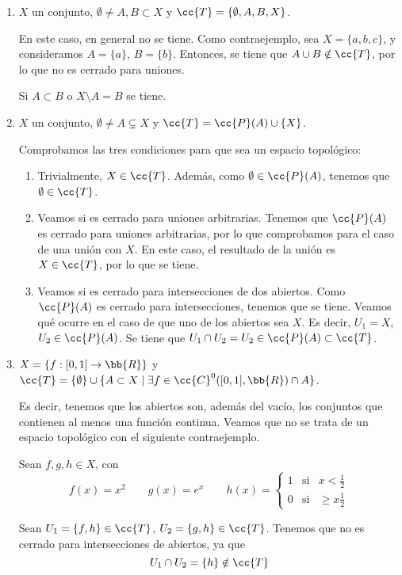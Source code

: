 \begin{ejercicio}
\begin{enumerate}[label=\alph*)]
        \item $X$ un conjunto, $\emptyset\neq A,B\subset X$ y $\cc{T}=\{\emptyset, A, B, X\}$.

        En este caso, en general no se tiene. Como contraejemplo, sea $X=\{a,b,c\}$, y consideramos $A=\{a\}$, $B=\{b\}$. Entonces, se tiene que $A\cup B\notin \cc{T}$, por lo que no es cerrado para uniones.

        Si $A\subset B$ o $X\setminus A=B$ se tiene.

        \item $X$ un conjunto, $\emptyset\neq A \subsetneq X$ y $\cc{T}=\cc{P}(A)\cup \{X\}$.

        Comprobamos las tres condiciones para que sea un espacio topológico:
        \begin{enumerate}
            \item Trivialmente, $X\in \cc{T}$. Además, como $\emptyset\in \cc{P}(A)$, tenemos que $\emptyset\in \cc{T}$.
            \item Veamos si es cerrado para uniones arbitrarias. Tenemos que $\cc{P}(A)$ es cerrado para uniones arbitrarias, por lo que comprobamos para el caso de una unión con $X$. En este caso, el resultado de la unión es $X\in \cc{T}$, por lo que se tiene.

            \item Veamos si es cerrado para intersecciones de dos abiertos. Como $\cc{P}(A)$ es cerrado para intersecciones, tenemos que se tiene. Veamos qué ocurre en el caso de que uno de los abiertos sea $X$. Es decir, $U_1=X$, $U_2\in \cc{P}(A)$. Se tiene que $U_1\cap U_2=U_2\in \cc{P}(A)\subset \cc{T}$.
        \end{enumerate}

        \item $X=\{f:[0,1]\to \bb{R}\}$ y $\cc{T}=\{\emptyset\}\cup \{A\subset X\mid \exists f\in \cc{C}^0([0,1],\bb{R})\cap A\}$.

        Es decir, tenemos que los abiertos son, además del vacío, los conjuntos que contienen al menos una función continua. Veamos que no se trata de un espacio topológico con el siguiente contraejemplo.

        Sean $f,g,h\in X$, con
        $$f(x)=x^2 \qquad g(x)=e^x \qquad h(x)=\left\{\begin{array}{ccc}
            1 & \text{si} & x<\frac{1}{2} \\
            0 & \text{si} & \geq x\frac{1}{2}
        \end{array}\right.$$

        Sean $U_1=\{f,h\}\in \cc{T}$, $U_2=\{g,h\}\in \cc{T}$. Tenemos que no es cerrado para intersecciones de abiertos, ya que
        $$U_1\cap U_2 = \{h\}\notin \cc{T}$$
    \end{enumerate}
\end{ejercicio}



